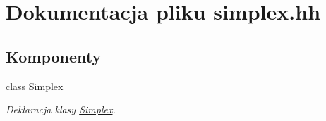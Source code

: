 \hypertarget{simplex_8hh}{\section{\-Dokumentacja pliku simplex.\-hh}
\label{simplex_8hh}
}
\subsection*{\-Komponenty}
\begin{DoxyCompactItemize}
\item 
class \hyperlink{class_simplex}{\-Simplex}
\begin{DoxyCompactList}\small\item\em \-Deklaracja klasy \hyperlink{class_simplex}{\-Simplex}. \end{DoxyCompactList}\end{DoxyCompactItemize}

